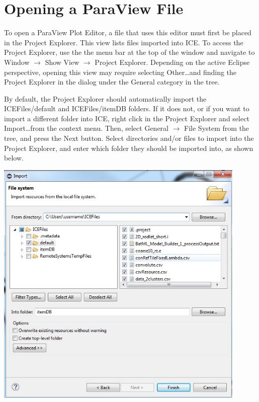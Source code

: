 \section{Opening a ParaView File} 

To open a ParaView Plot Editor, a file that uses this editor must first be
placed in the Project Explorer. This view lists files imported into ICE. To
access the Project Explorer, use the the menu bar at the top of the window and
navigate to Window $\rightarrow$ Show View $\rightarrow$ Project Explorer.
Depending on the active Eclipse perspective, opening this view may require
selecting Other\ldots and finding the Project Explorer in the dialog under the
General category in the tree.

By default, the Project Explorer should automatically import the
ICEFiles/default and ICEFiles/itemDB folders. If it does not, or if you want to
import a different folder into ICE, right click in the Project Explorer and
select Import\ldots from the context menu. Then, select General $\rightarrow$
File System from the tree, and press the Next button. Select directories and/or
files to import into the Project Explorer, and enter which folder they should
be imported into, as shown below.

\begin{center}
\includegraphics[width=12cm]{images/ImportFileDialog}
\end{center}

